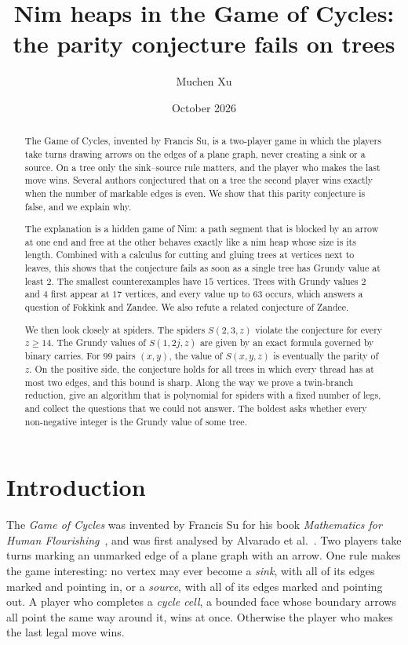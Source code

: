 \documentclass[11pt]{amsart}
\title[Nim heaps in the Game of Cycles]{Nim heaps in the Game of Cycles:\\ the parity conjecture fails on trees}
\author{Muchen Xu}
\date{October 2026}
\theoremstyle{definition}
\theoremstyle{remark}
\newcommand{\Sp}{S}
\begin{document}
\begin{abstract}
The Game of Cycles, invented by Francis Su, is a two-player game in which the players take turns drawing arrows on the edges of a plane graph, never creating a sink or a source. On a tree only the sink--source rule matters, and the player who makes the last move wins. Several authors conjectured that on a tree the second player wins exactly when the number of markable edges is even. We show that this parity conjecture is false, and we explain why.

The explanation is a hidden game of Nim: a path segment that is blocked by an arrow at one end and free at the other behaves exactly like a nim heap whose size is its length. Combined with a calculus for cutting and gluing trees at vertices next to leaves, this shows that the conjecture fails as soon as a single tree has Grundy value at least $2$. The smallest counterexamples have $15$ vertices. Trees with Grundy values $2$ and $4$ first appear at $17$ vertices, and every value up to $63$ occurs, which answers a question of Fokkink and Zandee. We also refute a related conjecture of Zandee.

We then look closely at spiders. The spiders $\Sp(2,3,z)$ violate the conjecture for every $z\ge 14$. The Grundy values of $\Sp(1,2j,z)$ are given by an exact formula governed by binary carries. For $99$ pairs $(x,y)$, the value of $\Sp(x,y,z)$ is eventually the parity of $z$. On the positive side, the conjecture holds for all trees in which every thread has at most two edges, and this bound is sharp. Along the way we prove a twin-branch reduction, give an algorithm that is polynomial for spiders with a fixed number of legs, and collect the questions that we could not answer. The boldest asks whether every non-negative integer is the Grundy value of some tree.
\end{abstract}

\maketitle

\section{Introduction}\label{sec:intro}

The \emph{Game of Cycles} was invented by Francis Su for his book \emph{Mathematics for Human Flourishing}~\cite{Su2020}, and was first analysed by Alvarado et al.~\cite{Alvarado2021}. Two players take turns marking an unmarked edge of a plane graph with an arrow. One rule makes the game interesting: no vertex may ever become a \emph{sink}, with all of its edges marked and pointing in, or a \emph{source}, with all of its edges marked and pointing out. A player who completes a \emph{cycle cell}, a bounded face whose boundary arrows all point the same way around it, wins at once. Otherwise the player who makes the last legal move wins.
\end{document}
